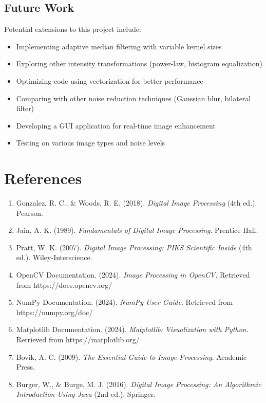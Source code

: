 \documentclass[12pt,a4paper]{article}
\begin{document}
\subsection{Future Work}
Potential extensions to this project include:
\begin{itemize}
    \item Implementing adaptive median filtering with variable kernel sizes
    \item Exploring other intensity transformations (power-law, histogram equalization)
    \item Optimizing code using vectorization for better performance
    \item Comparing with other noise reduction techniques (Gaussian blur, bilateral filter)
    \item Developing a GUI application for real-time image enhancement
    \item Testing on various image types and noise levels
\end{itemize}

\section{References}

\begin{enumerate}
    \item Gonzalez, R. C., \& Woods, R. E. (2018). \textit{Digital Image Processing} (4th ed.). Pearson.
    
    \item Jain, A. K. (1989). \textit{Fundamentals of Digital Image Processing}. Prentice Hall.
    
    \item Pratt, W. K. (2007). \textit{Digital Image Processing: PIKS Scientific Inside} (4th ed.). Wiley-Interscience.
    
    \item OpenCV Documentation. (2024). \textit{Image Processing in OpenCV}. Retrieved from https://docs.opencv.org/
    
    \item NumPy Documentation. (2024). \textit{NumPy User Guide}. Retrieved from https://numpy.org/doc/
    
    \item Matplotlib Documentation. (2024). \textit{Matplotlib: Visualization with Python}. Retrieved from https://matplotlib.org/
    
    \item Bovik, A. C. (2009). \textit{The Essential Guide to Image Processing}. Academic Press.
    
    \item Burger, W., \& Burge, M. J. (2016). \textit{Digital Image Processing: An Algorithmic Introduction Using Java} (2nd ed.). Springer.
\end{enumerate}
\end{document}
